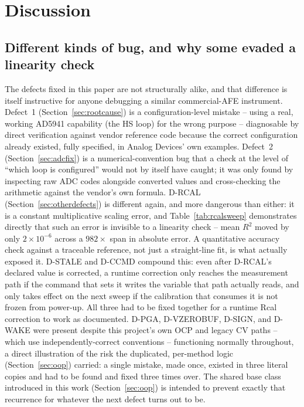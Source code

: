 \section{Discussion}
\label{sec:discussion}

\subsection{Different kinds of bug, and why some evaded a linearity check}
The defects fixed in this paper are not structurally alike, and
that difference is itself instructive for anyone debugging a similar
commercial-AFE instrument. Defect~1 (Section~\ref{sec:rootcause}) is a
configuration-level mistake -- using a real, working AD5941 capability
(the HS loop) for the wrong purpose -- diagnosable by direct verification
against vendor reference code because the correct configuration already
existed, fully specified, in Analog Devices' own examples. Defect~2
(Section~\ref{sec:adcfix}) is a numerical-convention bug that a
check at the level of ``which loop is configured'' would not by
itself have caught; it was only found by inspecting raw ADC codes
alongside converted values and cross-checking the arithmetic against the
vendor's own formula. D-RCAL (Section~\ref{sec:otherdefects}) is
different again, and more dangerous than either: it is a constant
multiplicative scaling error, and Table~\ref{tab:rcalsweep} demonstrates
directly that such an error is invisible to a linearity check -- mean
$R^2$ moved by only $2\times10^{-6}$ across a $982\times$ span in absolute
error. A quantitative accuracy check against a traceable reference, not
just a straight-line fit, is what actually exposed it. D-STALE and
D-CCMD compound this: even after D-RCAL's declared value is corrected,
a runtime correction only reaches the measurement path if the command
that sets it writes the variable that path actually reads, and only takes
effect on the next sweep if the calibration that consumes it is not
frozen from power-up. All three had to be fixed together for a runtime
Rcal correction to work as documented. D-PGA, D-VZEROBUF, D-SIGN, and
D-WAKE were present despite this project's own OCP and legacy CV paths --
which use independently-correct conventions -- functioning normally
throughout, a direct illustration of the risk the duplicated,
per-method logic (Section~\ref{sec:oop}) carried: a single mistake, made
once, existed in three literal copies and had to be found and fixed three
times over. The shared base class introduced in this work
(Section~\ref{sec:oop}) is intended to prevent exactly that recurrence for
whatever the next defect turns out to be.

